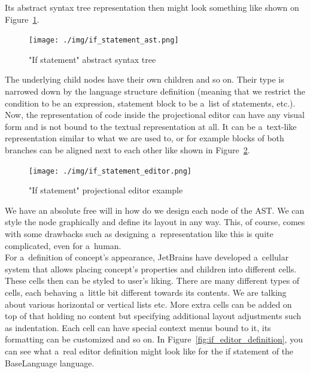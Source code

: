 \vspace{3mm}

Its abstract syntax tree representation then might look something like shown on Figure~\ref{fig:if_ast}.
\\

\begin{figure}[ht]
	\centering
	\texttt{[image: ./img/if\_statement\_ast.png]}
	\caption{"If statement" abstract syntax tree}
	\label{fig:if_ast}
\end{figure}

The underlying child nodes have their own children and so on.
Their type is narrowed down by the language structure definition (meaning that we restrict the condition to be an expression, statement block to be a~list of statements, etc.).
\\

Now, the representation of code inside the projectional editor can have any visual form and is not bound to the textual representation at all.
It can be a~text-like representation similar to what we are used to, or for example blocks of both branches can be aligned next to each other like shown in Figure~\ref{fig:if_editor}.
\\

\begin{figure}[ht]
	\centering
	\hspace{-4mm}
	\texttt{[image: ./img/if\_statement\_editor.png]}
	\caption{"If statement" projectional editor example}
	\label{fig:if_editor}
\end{figure}

We have an absolute free will in how do we design each node of the AST.
We can style the node graphically and define its layout in any way.
This, of course, comes with some drawbacks such as designing a~representation like this is quite complicated, even for a~human.
\\

For a~definition of concept's appearance, JetBrains have developed a~cellular system that allows placing concept's properties and children into different cells.
These cells then can be styled to user's liking.
There are many different types of cells, each behaving a~little bit different towards its contents.
We are talking about various horizontal or vertical lists etc.
More extra cells can be added on top of that holding no content but specifying additional layout adjustments such as indentation.
Each cell can have special context menus bound to it, its formatting can be customized and so on.
In Figure~\ref{fig:if_editor_definition}, you can see what a~real editor definition might look like for the if statement of the BaseLanguage language.

